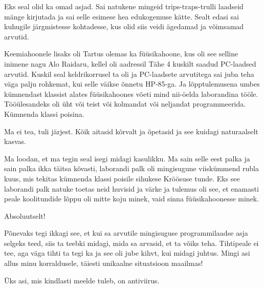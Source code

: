 
Eks seal olid ka omad asjad. Sai natukene mingeid trips-traps-trulli laadseid mänge kirjutada ja sai selle esimese hea edukogemuse kätte. Sealt edasi sai kuhugile järgmistesse kohtadesse, kus olid siis veidi ägedamad ja võimsamad arvutid.

Keemiahoonele lisaks oli Tartus olemas ka füüsikahoone, kus oli see selline inimene nagu Alo Raidaru, kellel oli aadressil Tähe 4 kuskilt saadud PC-laadsed arvutid. Kuskil seal keldrikorrusel ta oli ja PC-laadsete arvutitega sai juba teha väga palju rohkemat, kui selle väikse õnnetu HP-85-ga. Ja lõpptulemusena  umbes kümnendast klassist alates füüsikahoones võeti mind nii-öelda laborandina tööle. Tööülesandeks oli üht või teist või kolmandat või neljandat programmeerida. Kümnenda klassi poisina.


Ma ei tea, tuli järjest. Kõik aitasid kõrvalt ja õpetasid ja see kuidagi naturaalselt kasvas.

Ma loodan, et ma tegin seal isegi midagi kasulikku. Ma sain selle eest palka ja sain palka ikka täitsa kõvasti, laborandi palk oli mingisugune viiskümmend rubla kuus, mis tekitas kümnenda klassi poisile sihukese Kröösuse tunde. Eks see laborandi palk natuke toetas neid huvisid ja värke ja tulemus oli see, et enamasti peale koolitundide lõppu oli mitte koju minek, vaid sinna füüsikahoonesse minek.


Absoluutselt!


Põnevaks tegi ikkagi see, et kui sa arvutile mingisuguse programmilaadse asja selgeks teed, siis ta teebki midagi, mida sa arvasid, et ta võiks teha. Tihtipeale ei tee, aga väga tihti ta tegi ka ja see oli jube kihvt, kui midagi juhtus. Mingi asi allus  minu korraldusele, täiesti unikaalne situatsioon maailmas!


Üks asi, mis kindlasti meelde tuleb, on antiviirus. 


